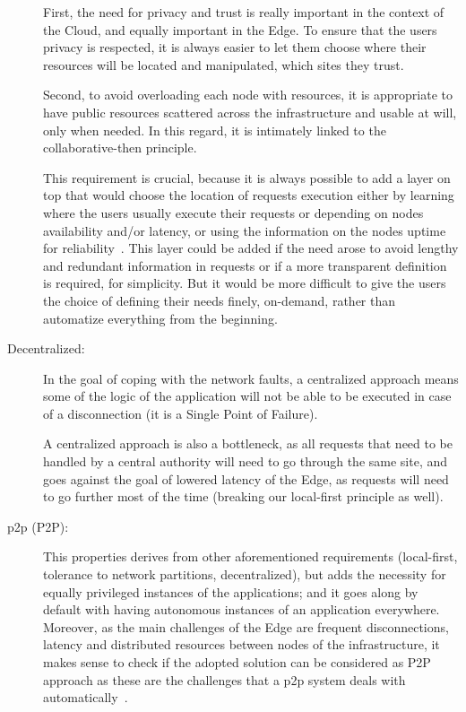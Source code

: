 \begin{description}
First, the need for privacy and trust is really important in the
context of the Cloud, and equally important in the Edge.
%
To ensure that the users privacy is respected, it is always easier to
let them choose where their resources will be located and manipulated,
which sites they trust.
%

Second, to avoid overloading each node with resources, it is
appropriate to have public resources scattered across the
infrastructure and usable at will, only when needed.
%
In this regard, it is intimately linked to the collaborative-then
principle.
%

This requirement is crucial, because it is always possible to add a
layer on top that would choose the location of requests execution
either by learning where the users usually execute their requests or
depending on nodes availability and/or latency, or using the
information on the nodes uptime for reliability~\cite{FMPS10, Lim21}.
%
This layer could be added if the need arose to avoid lengthy and
redundant information in requests or if a more transparent definition
is required, \eg for simplicity.
%
But it would be more difficult to give the users the choice of
defining their needs finely, on-demand, rather than automatize everything
from the beginning.
\item [Decentralized:] In the goal of coping with the network faults,
a centralized approach means some of the logic of the application will
not be able to be executed in case of a disconnection (it is a Single
Point of Failure).
%

A centralized approach is also a bottleneck, as all requests that need
to be handled by a central authority will need to go through the same
site, and goes against the goal of lowered latency of the Edge, as
requests will need to go further most of the time (breaking our
local-first principle as well).
\item [\Gls{p2p} (\acrshort{P2P}):] This properties derives from other
aforementioned requirements (local-first, tolerance to network
partitions, decentralized), but adds the necessity for equally
privileged instances of the applications; and it goes along by default
with having autonomous instances of an application everywhere.
%
Moreover, as the main challenges of the Edge are frequent
disconnections, latency and distributed resources between nodes of the
infrastructure, it makes sense to check if the adopted solution can be
considered as \acrshort{P2P} approach as these are the challenges that a
\gls{p2p} system deals with automatically~\cite{Sch01}.
\end{description}




